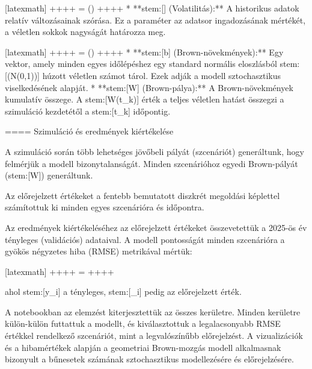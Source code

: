 \documentclass[11pt]{article}
\begin{document}
[latexmath]
++++
\mu = \left(\right)
++++
*   **stem:[\sigma] (Volatilitás):** A historikus adatok relatív változásainak szórása. Ez a paraméter az adatsor ingadozásának mértékét, a véletlen sokkok nagyságát határozza meg.

[latexmath]
++++
\sigma = \left(\right)
++++
*   **stem:[b] (Brown-növekmények):** Egy vektor, amely minden egyes időlépéshez egy standard normális eloszlásból stem:[({N}(0,1))] húzott véletlen számot tárol. Ezek adják a modell sztochasztikus viselkedésének alapját.
*   **stem:[W] (Brown-pálya):** A Brown-növekmények kumulatív összege. A stem:[W(t_k)] érték a teljes véletlen hatást összegzi a szimuláció kezdetétől a stem:[t_k] időpontig.

==== Szimuláció és eredmények kiértékelése

A szimuláció során több lehetséges jövőbeli pályát (szcenáriót) generáltunk, hogy felmérjük a modell bizonytalanságát. Minden szcenárióhoz egyedi Brown-pályát (stem:[W]) generáltunk.

Az előrejelzett értékeket a fentebb bemutatott diszkrét megoldási képlettel számítottuk ki minden egyes szcenárióra és időpontra.

Az eredmények kiértékeléséhez az előrejelzett értékeket összevetettük a 2025-ös év tényleges (validációs) adataival. A modell pontosságát minden szcenárióra a gyökös négyzetes hiba (RMSE) metrikával mértük:

[latexmath]
++++
 = 
++++

ahol stem:[y_i] a tényleges, stem:[_i] pedig az előrejelzett érték.

A notebookban az elemzést kiterjesztettük az összes kerületre. Minden kerületre külön-külön futtattuk a modellt, és kiválasztottuk a legalacsonyabb RMSE értékkel rendelkező szcenáriót, mint a legvalószínűbb előrejelzést. A vizualizációk és a hibamértékek alapján a geometriai Brown-mozgás modell alkalmasnak bizonyult a bűnesetek számának sztochasztikus modellezésére és előrejelzésére.
\end{document}
